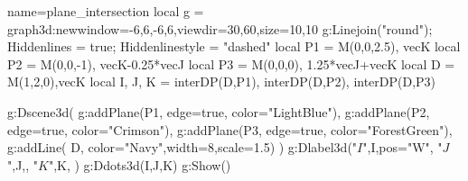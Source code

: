 \documentclass[12pt]{standalone}
\begin{document}
\begin{luadraw}{name=plane_intersection}
local g = graph3d:new{window={-6,6,-6,6},viewdir={30,60},size={10,10}}
g:Linejoin("round"); Hiddenlines = true; Hiddenlinestyle = "dashed"
local P1 = {M(0,0,2.5), vecK}
local P2 = {M(0,0,-1), vecK-0.25*vecJ}
local P3 = {M(0,0,0), 1.25*vecJ+vecK}
local D = {M(1,2,0),vecK}
local I, J, K = interDP(D,P1), interDP(D,P2), interDP(D,P3)

g:Dscene3d(
    g:addPlane(P1, {edge=true, color="LightBlue"}),
    g:addPlane(P2, {edge=true, color="Crimson"}),
    g:addPlane(P3, {edge=true, color="ForestGreen"}),
    g:addLine( D, {color="Navy",width=8,scale=1.5})
)
g:Dlabel3d("$I$",I,{pos="W"}, "$J$",J,{}, "$K$",K, {})
g:Ddots3d({I,J,K})
g:Show()
\end{luadraw}
\end{document}
